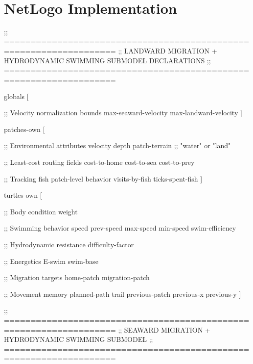 \documentclass[
]{book}
\newenvironment{Shaded}{\begin{snugshade}}{\end{snugshade}}
\newcommand{\NormalTok}[1]{#1}
\begin{document}
\section{NetLogo Implementation}\label{netlogo-implementation-8}

\begin{Shaded}
\begin{Highlighting}[]

\NormalTok{;; ===================================================================}
\NormalTok{;;  LANDWARD MIGRATION + HYDRODYNAMIC SWIMMING SUBMODEL DECLARATIONS}
\NormalTok{;; ===================================================================}

\NormalTok{globals [}

\NormalTok{  ;; Velocity normalization bounds}
\NormalTok{  max{-}seaward{-}velocity}
\NormalTok{  max{-}landward{-}velocity}
\NormalTok{]}

\NormalTok{patches{-}own [}

\NormalTok{  ;; Environmental attributes}
\NormalTok{  velocity}
\NormalTok{  depth}
\NormalTok{  patch{-}terrain   ;; "water" or "land"}

\NormalTok{  ;; Least{-}cost routing fields}
\NormalTok{  cost{-}to{-}home}
\NormalTok{  cost{-}to{-}sea}
\NormalTok{  cost{-}to{-}prey}

\NormalTok{  ;; Tracking fish patch{-}level behavior}
\NormalTok{  visits{-}by{-}fish}
\NormalTok{  ticks{-}spent{-}fish}
\NormalTok{]}

\NormalTok{turtles{-}own [}

\NormalTok{  ;; Body condition}
\NormalTok{  weight}

\NormalTok{  ;; Swimming behavior}
\NormalTok{  speed}
\NormalTok{  prev{-}speed}
\NormalTok{  max{-}speed}
\NormalTok{  min{-}speed}
\NormalTok{  swim{-}efficiency}

\NormalTok{  ;; Hydrodynamic resistance}
\NormalTok{  difficulty{-}factor}

\NormalTok{  ;; Energetics}
\NormalTok{  E{-}swim}
\NormalTok{  swim{-}base}

\NormalTok{  ;; Migration targets}
\NormalTok{  home{-}patch}
\NormalTok{  migration{-}patch}

\NormalTok{  ;; Movement memory}
\NormalTok{  planned{-}path}
\NormalTok{  trail}
\NormalTok{  previous{-}patch}
\NormalTok{  previous{-}x}
\NormalTok{  previous{-}y}
\NormalTok{]}

\NormalTok{;; ===================================================================}
\NormalTok{;;  SEAWARD MIGRATION + HYDRODYNAMIC SWIMMING SUBMODEL}
\NormalTok{;; ===================================================================}


\end{Highlighting}
\end{Shaded}
\end{document}
